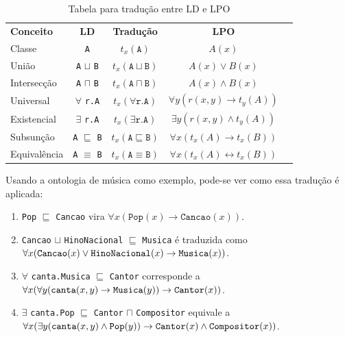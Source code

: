 \begin{table}[H]
	\centering
	\begin{tabular}{|l|c|c|c|l}
		\cline{1-4}
		\textbf{Conceito}     & \textbf{LD}                                    & \textbf{Tradução}                                 & \textbf{LPO}                                            &  \\ \cline{1-4}
		Classe       & \texttt{A}                            & $t_x(\texttt{A})$                        & $A(x)$                                           &  \\ \cline{1-4}
		União        & \texttt{A} $ \sqcup $ \texttt{B}      & $t_x(\texttt{A} \sqcup \texttt{B})$      & $A(x) \lor B(x)$                                 &  \\ \cline{1-4}
		Intersecção  & \texttt{A} $ \sqcap $ \texttt{B}      & $t_x(\texttt{A} \sqcap \texttt{B})$      & $A(x) \land B(x)$                                &  \\ \cline{1-4}
		Universal    & $\forall$ \texttt{r.A}                & $t_x(\forall \texttt{r.A})$              & $\forall y(r(x,y) \to t_y(A))$                   &  \\ \cline{1-4}
		Existencial  & $\exists$ \texttt{r.A}                & $t_x(\exists \texttt{r.A})$              & $\exists y(r(x,y) \land t_y(A))$                 &  \\ \cline{1-4}
		Subsunção    & \texttt{A} $ \sqsubseteq $ \texttt{B} & $t_x(\texttt{A} \sqsubseteq \texttt{B})$ & $\forall x(t_x(A) \to t_x(B))$                   &  \\ \cline{1-4}
		Equivalência & \texttt{A} $ \equiv $ \texttt{B}      & $t_x(\texttt{A} \equiv \texttt{B})$      & $\forall x(t_x(A) \longleftrightarrow t_x(B))$   &  \\ \cline{1-4}
	\end{tabular}
	\caption{Tabela para tradução entre LD e LPO}
	\label{tab:trad}
\end{table}

Usando a ontologia de música como exemplo, pode-se ver como essa tradução é aplicada:

\begin{enumerate}
	\item \texttt{Pop} $ \sqsubseteq $ \texttt{Cancao} vira $\forall x(\texttt{Pop}(x) \to \texttt{Cancao}(x))$.
	\item \texttt{Cancao} $ \sqcup $ \texttt{HinoNacional} $ \sqsubseteq $ \texttt{Musica} é traduzida como $\forall x(\texttt{Cancao}(x) \lor \texttt{HinoNacional}(x) \\ \to \texttt{Musica}(x))$.
	\item $ \forall $ \texttt{canta.Musica} $ \sqsubseteq $ \texttt{Cantor} corresponde a $ \forall x(\forall y(\texttt{canta}(x,y) \to \texttt{Musica}(y)) \to \\ \texttt{Cantor}(x)) $.
	\item $ \exists $ \texttt{canta.Pop} $ \sqsubseteq $ \texttt{Cantor} $ \sqcap $ \texttt{Compositor} equivale a $ \forall x (\exists y(\texttt{canta}(x,y) \land \texttt{Pop}(y)) \to \\ \texttt{Cantor}(x) \land \texttt{Compositor}(x))$.
\end{enumerate}


